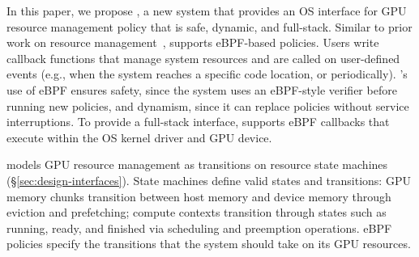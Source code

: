 In this paper, we propose \sys, a new system that provides an OS interface for GPU resource management policy that is safe, dynamic, and full-stack.
Similar to prior work on resource management~\cite{schedext-docs, zussman2025cache_ext, bachl2021flow}, \sys{} supports eBPF-based policies.
Users write callback functions that manage system resources and are called on user-defined events (e.g., when the system reaches a specific code location, or periodically).
\sys{}'s use of eBPF ensures safety, since the system uses an eBPF-style verifier before running new policies, and dynamism, since it can replace policies without service interruptions.
To provide a full-stack interface, \sys{} supports eBPF callbacks that execute within the OS kernel driver and GPU device.

\sys models GPU resource management as transitions on resource state machines (\S\ref{sec:design-interfaces}).
State machines define valid states and transitions: GPU memory chunks transition between host memory and device memory through eviction and prefetching; compute contexts transition through states such as running, ready, and finished via scheduling and preemption operations.
eBPF policies specify the transitions that the system should take on its GPU resources.




